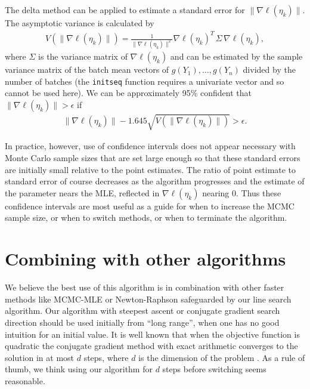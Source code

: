 \documentclass[oneside]{myumnStatThesis}
\begin{document}
The delta method can be applied to estimate a standard error for $\lVert \nabla \ell( \eta_k ) \rVert$. The asymptotic 
variance is calculated by
\begin{align*}
	V \left( \lVert \nabla \ell( \eta_k ) \rVert \right )= \frac{1}{\lVert \nabla \ell( \eta_k ) \rVert^2} \nabla \ell
( \eta_k )^T \, \Sigma \,  \nabla \ell( \eta_k ),
\end{align*}
where $\Sigma$ is the variance matrix of $\nabla \ell( \eta_k )$ and can be estimated by the sample variance matrix of 
the batch mean vectors of $g(Y_1), \ldots, g(Y_n)$ divided by the number of batches (the \texttt{initseq} function 
requires a univariate vector and so cannot be used here).  We can be approximately 95\% confident that $\lVert 
\nabla \ell( \eta_k ) \rVert > \epsilon$ if 
\begin{align*}
	\lVert \nabla \ell( \eta_k ) \rVert - 1.645 \sqrt{ V \left( \lVert \nabla \ell( \eta_k ) \rVert \right )} > 
\epsilon.
\end{align*}

In practice, however, use of confidence intervals does not appear necessary with  Monte Carlo sample sizes that are set 
large enough so that these standard errors are initially small relative to the point estimates.  The ratio of point 
estimate to standard error of course decreases as the algorithm progresses and the estimate of the parameter nears the 
MLE, reflected in $\nabla \ell( \eta_k )$ nearing 0.  Thus these confidence intervals are most useful as a guide for
when to increase the MCMC sample size, or when to switch methods, or when to terminate the algorithm.



\section{Combining with other algorithms}
We believe the best use of this algorithm is in combination with other faster methods like MCMC-MLE \citep{Geyer:1992}
or Newton-Raphson safeguarded by our line search algorithm.  Our algorithm with steepest ascent or conjugate gradient search direction
should be used initially from ``long range'', when one has no good intuition for an initial value.
It is well known that when the objective function is quadratic the conjugate gradient method with exact arithmetic converges to the solution
in at most $d$ steps, where $d$ is the dimension of the problem \citep{NW}.  As a rule of thumb, we think using our 
algorithm for $d$ steps before switching seems reasonable.
 
\end{document}
